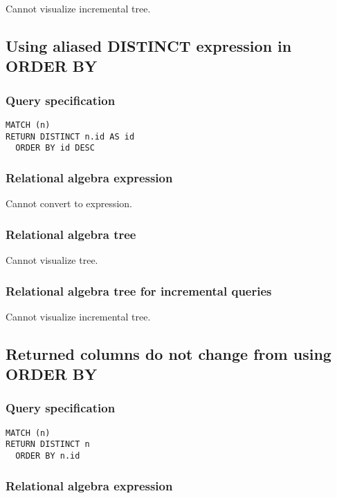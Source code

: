 Cannot visualize incremental tree.

\subsection{Using aliased DISTINCT expression in ORDER BY}

\subsubsection*{Query specification}

\begin{lstlisting}
MATCH (n)
RETURN DISTINCT n.id AS id
  ORDER BY id DESC
\end{lstlisting}

\subsubsection*{Relational algebra expression}

Cannot convert to expression.

\subsubsection*{Relational algebra tree}

Cannot visualize tree.

\subsubsection*{Relational algebra tree for incremental queries}

Cannot visualize incremental tree.

\subsection{Returned columns do not change from using ORDER BY}

\subsubsection*{Query specification}

\begin{lstlisting}
MATCH (n)
RETURN DISTINCT n
  ORDER BY n.id
\end{lstlisting}

\subsubsection*{Relational algebra expression}

